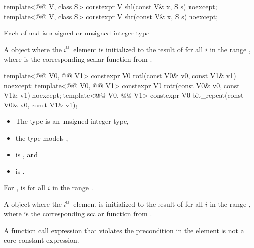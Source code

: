\begin{itemdecl}
template<@@ V, class S>
  constexpr V shl(const V& x, S s) noexcept;
template<@@ V, class S>
  constexpr V shr(const V& x, S s) noexcept;
\end{itemdecl}

\begin{itemdescr}
\pnum
\constraints
Each of  and 
is a signed or unsigned integer type.

\pnum
\returns
A  object where the $i^\text{th}$ element is initialized to
the result of 
for all $i$ in the range ,
where  is the corresponding scalar function from .
\end{itemdescr}

\begin{itemdecl}
template<@@ V0, @@ V1>
  constexpr V0 rotl(const V0& v0, const V1& v1) noexcept;
template<@@ V0, @@ V1>
  constexpr V0 rotr(const V0& v0, const V1& v1) noexcept;
template<@@ V0, @@ V1>
  constexpr V0 bit_repeat(const V0& v0, const V1& v1);
\end{itemdecl}

\begin{itemdescr}
\pnum
\constraints
\begin{itemize}
 \item
   The type  is an unsigned integer type,
 \item
   the type  models ,
 \item
    is , and
 \item
    is .
\end{itemize}

\pnum
\expects
For ,
 is 
for all $i$ in the range .

\pnum
\returns
A  object where the $i^\text{th}$ element is initialized to
the result of  for all $i$ in the range ,
where  is the corresponding scalar function from .

\pnum
\remarks
A function call expression that violates the precondition in the \expects
element is not a core constant expression.
\end{itemdescr}

